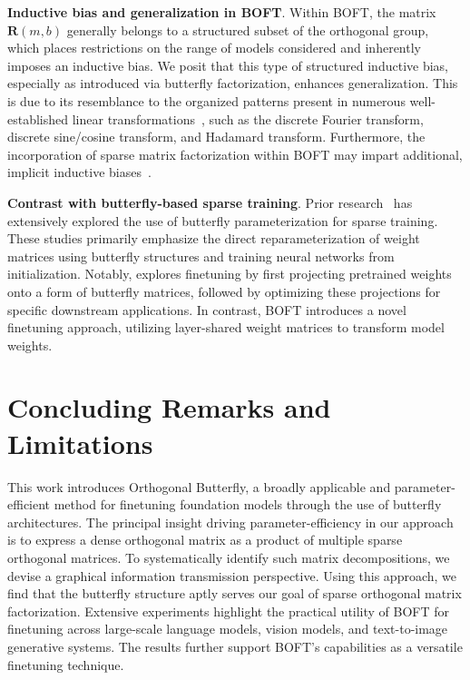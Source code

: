 \textbf{Inductive bias and generalization in BOFT}. Within BOFT, the matrix $\bm{R}(m,b)$ generally belongs to a structured subset of the orthogonal group, which places restrictions on the range of models considered and inherently imposes an inductive bias. We posit that this type of structured inductive bias, especially as introduced via butterfly factorization, enhances generalization. This is due to its resemblance to the organized patterns present in numerous well-established linear transformations~\cite{dao2019kaleidoscope}, such as the discrete Fourier transform, discrete sine/cosine transform, and Hadamard transform. Furthermore, the incorporation of sparse matrix factorization within BOFT may impart additional, implicit inductive biases~\cite{gunasekar2017implicit,li2018algorithmic,liu2019neural}.

\textbf{Contrast with butterfly-based sparse training}. Prior research~\cite{dao2019learning,dao2019kaleidoscope,chen2022pixelated,dao2022monarch} has extensively explored the use of butterfly parameterization for sparse training. These studies primarily emphasize the direct reparameterization of weight matrices using butterfly structures and training neural networks from initialization. Notably, \cite{dao2022monarch} explores finetuning by first projecting pretrained weights onto a form of butterfly matrices, followed by optimizing these projections for specific downstream applications. In contrast, BOFT introduces a novel finetuning approach, utilizing layer-shared weight matrices to transform model weights.



\section{Concluding Remarks and Limitations}

This work introduces Orthogonal Butterfly, a broadly applicable and parameter-efficient method for finetuning foundation models through the use of butterfly architectures. The principal insight driving parameter-efficiency in our approach is to express a dense orthogonal matrix as a product of multiple sparse orthogonal matrices. To systematically identify such matrix decompositions, we devise a graphical information transmission perspective. Using this approach, we find that the butterfly structure aptly serves our goal of sparse orthogonal matrix factorization. Extensive experiments highlight the practical utility of BOFT for finetuning across large-scale language models, vision models, and text-to-image generative systems. The results further support BOFT's capabilities as a versatile finetuning technique.

